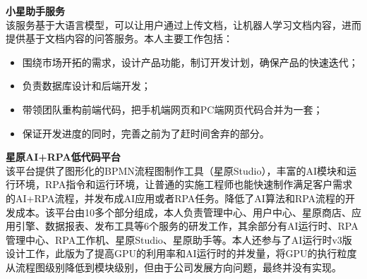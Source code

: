 \documentclass[a4paper]{article}
\newenvironment{changemargin}[2]{%
  \begin{list}{}{%
    \setlength{\topsep}{0pt}%
    \setlength{\leftmargin}{#1}%
    \setlength{\rightmargin}{#2}%
    \setlength{\listparindent}{\parindent}%
    \setlength{\itemindent}{\parindent}%
    \setlength{\parsep}{\parskip}%
  }%
  \item[]}{\end{list}
}
\newenvironment{body} {
	\vspace*{-16pt}
	\begin{changemargin}{-0.5in}{-0.5in}
  }	
	{\end{changemargin}
}
\begin{document}
\begin{body}
	\vspace{14pt}
  	\textbf{小星助手服务} \\
  	\smallskip
 	该服务基于大语言模型，可以让用户通过上传文档，让机器人学习文档内容，进而提供基于文档内容的问答服务。本人主要工作包括：
	\vspace*{-2pt}
	\begin{itemize} \itemsep -0pt  %
		\item 围绕市场开拓的需求，设计产品功能，制订开发计划，确保产品的快速迭代；\\
	\end{itemize}
	\vspace*{-10pt}
	\begin{itemize} \itemsep -0pt  %
		\item 负责数据库设计和后端开发；\\
	\end{itemize}
	\vspace*{-10pt}
	\begin{itemize} \itemsep -0pt  %
		\item 带领团队重构前端代码，把手机端网页和PC端网页代码合并为一套；\\
	\end{itemize}
	\vspace*{-10pt}
	\begin{itemize} \itemsep -0pt  %
		\item 保证开发进度的同时，完善之前为了赶时间舍弃的部分。\\
	\end{itemize}
	
	\vspace{14pt}
  	\textbf{星原AI+RPA低代码平台} \\
  	\smallskip
 	该平台提供了图形化的BPMN流程图制作工具（星原Studio），丰富的AI模块和运行环境，RPA指令和运行环境，让普通的实施工程师也能快速制作满足客户需求的AI+RPA流程，并发布成AI应用或者RPA任务。降低了AI算法和RPA流程的开发成本。该平台由10多个部分组成，本人负责管理中心、用户中心、星原商店、应用引擎、数据报表、发布工具等6个服务的研发工作，其余部分有AI运行时、RPA管理中心、RPA工作机、星原Studio、星原助手等。本人还参与了AI运行时v3版设计工作，此版为了提高GPU的利用率和AI运行时的并发量，将GPU的执行粒度从流程图级别降低到模块级别，但由于公司发展方向问题，最终并没有实现。\\
	

\end{body}
\end{document}
